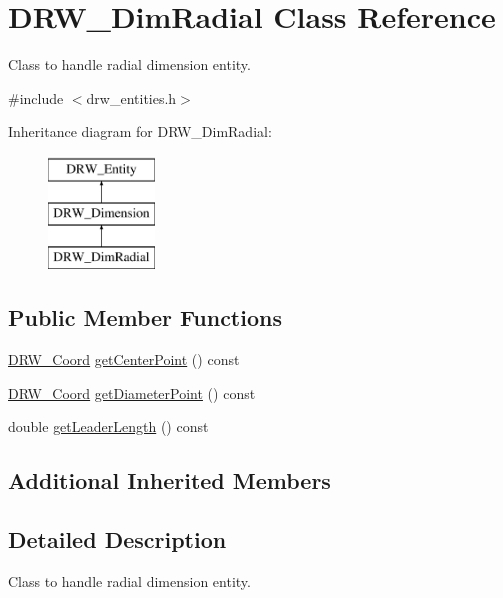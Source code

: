 \hypertarget{class_d_r_w___dim_radial}{}\section{D\+R\+W\+\_\+\+Dim\+Radial Class Reference}
\label{class_d_r_w___dim_radial}


Class to handle radial dimension entity.  




{\ttfamily \#include $<$drw\+\_\+entities.\+h$>$}

Inheritance diagram for D\+R\+W\+\_\+\+Dim\+Radial\+:\begin{figure}[H]
\begin{center}
\leavevmode
\includegraphics[height=3.000000cm]{da/d95/class_d_r_w___dim_radial}
\end{center}
\end{figure}
\subsection*{Public Member Functions}
\begin{DoxyCompactItemize}
\item 
\hyperlink{class_d_r_w___coord}{D\+R\+W\+\_\+\+Coord} \hyperlink{class_d_r_w___dim_radial_a81bb02a4fd5574ac4bd2321ed7936b22}{get\+Center\+Point} () const 
\item 
\hyperlink{class_d_r_w___coord}{D\+R\+W\+\_\+\+Coord} \hyperlink{class_d_r_w___dim_radial_ac0c68b23a408f7f9c12a8b1d6ef6f4db}{get\+Diameter\+Point} () const 
\item 
double \hyperlink{class_d_r_w___dim_radial_ab1127a65b14758a780d3e2e4a3b0b102}{get\+Leader\+Length} () const 
\end{DoxyCompactItemize}
\subsection*{Additional Inherited Members}


\subsection{Detailed Description}
Class to handle radial dimension entity. 


